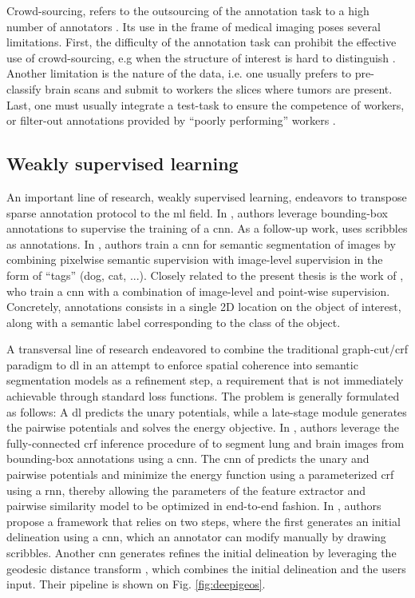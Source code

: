 Crowd-sourcing, refers to the outsourcing of the annotation task to a high number of annotators \cite{orting19}.
Its use in the frame of medical imaging poses several limitations.
First, the difficulty of the annotation task can prohibit the effective use of crowd-sourcing, e.g when the structure of interest is hard to distinguish \cite{orting19}.
Another limitation is the nature of the data, i.e. one usually prefers to pre-classify brain scans and submit to workers the slices where tumors are present.
Last, one must usually integrate a test-task to ensure the competence of workers, or filter-out annotations provided by ``poorly performing'' workers \cite{park18}.

\subsection{Weakly supervised learning}
An important line of research, weakly supervised learning, endeavors to transpose sparse annotation protocol to the \gls{ml} field.
In \cite{dai15}, authors leverage bounding-box annotations to supervise the training of a \gls{cnn}.
As a follow-up work, \cite{lin16} uses scribbles as annotations.
In \cite{papandreou15}, authors train a \gls{cnn} for semantic segmentation of images by combining pixelwise semantic supervision with image-level supervision in the form of ``tags'' (dog, cat, ...).
Closely related to the present thesis is the work of \cite{bearman16}, who train a \gls{cnn} with a combination of image-level and point-wise supervision.
Concretely, annotations consists in a single 2D location on the object of interest, along with a semantic label corresponding to the class of the object.

A transversal line of research endeavored to combine the traditional graph-cut/\gls{crf} paradigm to \gls{dl} in an attempt to enforce spatial coherence into semantic segmentation models as a refinement step, a requirement that is not immediately achievable through standard loss functions.
The problem is generally formulated as follows: A \gls{dl} predicts the unary potentials, while a late-stage module generates the pairwise potentials and solves the energy objective.
In \cite{rajchl16}, authors leverage the fully-connected \gls{crf} inference procedure of \cite{krahenbuhl11} to segment lung and brain images from bounding-box annotations using a \gls{cnn}.
The \gls{cnn} of \cite{rajchl16} predicts the unary and pairwise potentials and minimize the energy function using a parameterized \gls{crf} using a \gls{rnn}, thereby allowing the parameters of the feature extractor and pairwise similarity model to be optimized in end-to-end fashion.
In \cite{wang18}, authors propose a framework that relies on two steps, where the first generates an initial delineation using a \gls{cnn}, which an annotator can modify manually by drawing scribbles.
Another \gls{cnn} generates refines the initial delineation by leveraging the geodesic distance transform \cite{criminisi08}, which combines the initial delineation and the users input.
Their pipeline is shown on Fig. \ref{fig:deepigeos}.

